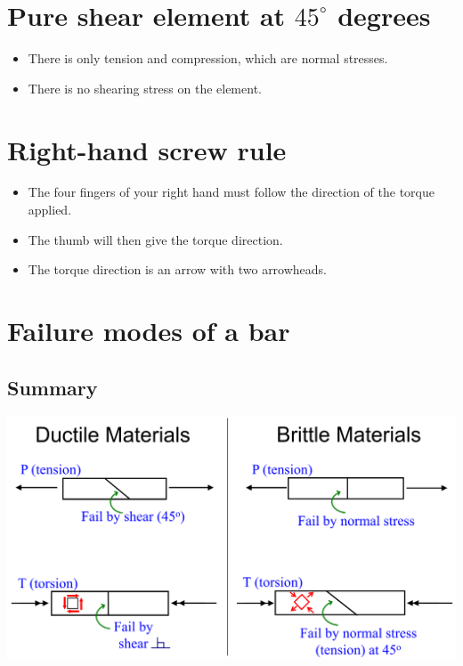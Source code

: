 \documentclass[11pt]{article}
\begin{document}
\section{Pure shear element at \(45^{\circ}\) degrees}
\label{sec:orgd257a30}
\begin{itemize}
\item There is only tension and compression, which are normal stresses.
\item There is no shearing stress on the element.
\end{itemize}

\newpage

\section{Right-hand screw rule}
\label{sec:org11d0ad2}
\begin{itemize}
\item The four fingers of your right hand must follow the direction of the torque applied.
\item The thumb will then give the torque direction.
\item The torque direction is an arrow with two arrowheads.
\end{itemize}


\section{Failure modes of a bar}
\label{sec:orgfe7ee63}

\subsection{Summary}
\label{sec:org9ff7448}
\begin{center}
\includegraphics[width=.9\linewidth]{./images/failure-modes-summary.png}
\end{center}
\end{document}

